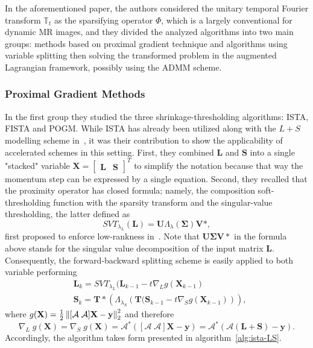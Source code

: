 In the aforementioned paper, the authors considered the unitary temporal Fourier transform $\mathbb{T}_t$ as the sparsifying operator $\Phi$, which is a largely conventional for dynamic MR images, and they divided the analyzed algorithms into two main groups: methods based on proximal gradient technique and algorithms using variable splitting then solving the transformed problem in the augmented Lagrangian framework, possibly using the ADMM scheme.

\subsubsection{Proximal Gradient Methods}
In the first group they studied the three shrinkage-thresholding algorithms: ISTA, FISTA and POGM. While ISTA has already been utilized along with the $L+S$ modelling scheme in~\cite{otazo_low-rank_2015}, it was their contribution to show the applicability of accelerated schemes in this setting. First, they combined $\mathbf{L}$ and $\mathbf{S}$ into a single "stacked" variable $\mathbf{X} = \left[\begin{matrix}\mathbf{L} & \mathbf{S}\end{matrix}\right]^T$ to simplify the notation because that way the momentum step can be expressed by a single equation. Second, they recalled that the proximity operator has closed formula; namely, the composition soft-thresholding function with the sparsity transform and the singular-value thresholding, the latter defined as
\[SVT_{\lambda_L}(\mathbf{L}) = \mathbf{U}\Lambda_\lambda(\boldsymbol{\Sigma})\mathbf{V}*,\]
first proposed to enforce low-rankness in~\cite{cai_singular_2008}. Note that $\mathbf{U}\boldsymbol{\Sigma}\mathbf{V}*$ in the formula above stands for the singular value decomposition of the input matrix $\mathbf{L}$. Consequently, the forward-backward splitting scheme is easily applied to both variable performing
\begin{align*}
    & \mathbf{L}_k = SVT_{\lambda_L}(\mathbf{L}_{k-1} - t \nabla_L g(\mathbf{X}_{k-1})\\
    & \mathbf{S}_k = \mathbf{T}*\left(\Lambda_{\lambda_S}\left(\mathbf{T}(\mathbf{S}_{k-1} - t \nabla_S g(\mathbf{X}_{k-1})\right)\right),
\end{align*}
where $g(\mathbf{X}) = \frac{1}{2}\left\lVert[\mathcal{A} \; \mathcal{A}]\mathbf{X} - \mathbf{y}\right\rVert_2^2$ and therefore \[\nabla_L\; g(\mathbf{X}) = \nabla_S\; g(\mathbf{X}) = \mathcal{A}^*([\mathcal{A} \; \mathcal{A}]\mathbf{X} - \mathbf{y}) = \mathcal{A}^*(\mathcal{A} (\mathbf{L + S}) - \mathbf{y}).\] Accordingly, the algorithm takes form presented in algorithm~\ref{alg:ista-LS}.

